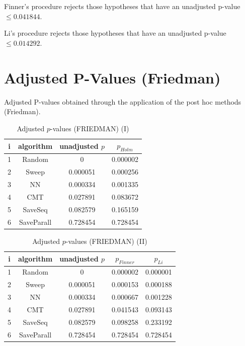 \documentclass[a4paper,10pt]{article}
\begin{document}
\begin{landscape}
Finner's procedure rejects those hypotheses that have an unadjusted p-value $\le0.041844$.

Li's procedure rejects those hypotheses that have an unadjusted p-value $\le0.014292$.


\newpage

\section{Adjusted P-Values (Friedman)}


Adjusted P-values obtained through the application of the post hoc methods (Friedman).

\begin{table}[!htp]
\centering\small
\begin{tabular}{cccc}
i&algorithm&unadjusted $p$&$p_{Holm}$\\
\hline1&Random&0&0.000002\\2&Sweep&0.000051&0.000256\\3&NN&0.000334&0.001335\\4&CMT&0.027891&0.083672\\5&SaveSeq&0.082579&0.165159\\6&SaveParall&0.728454&0.728454\\\hline
\end{tabular}
\caption{Adjusted $p$-values (FRIEDMAN) (I)}
\end{table}
\begin{table}[!htp]
\centering\small
\begin{tabular}{ccccc}
i&algorithm&unadjusted $p$&$p_{Finner}$&$p_{Li}$\\
\hline1&Random&0&0.000002&0.000001\\2&Sweep&0.000051&0.000153&0.000188\\3&NN&0.000334&0.000667&0.001228\\4&CMT&0.027891&0.041543&0.093143\\5&SaveSeq&0.082579&0.098258&0.233192\\6&SaveParall&0.728454&0.728454&0.728454\\\hline
\end{tabular}
\caption{Adjusted $p$-values (FRIEDMAN) (II)}
\end{table}

\newpage
\end{landscape}
\end{document}
